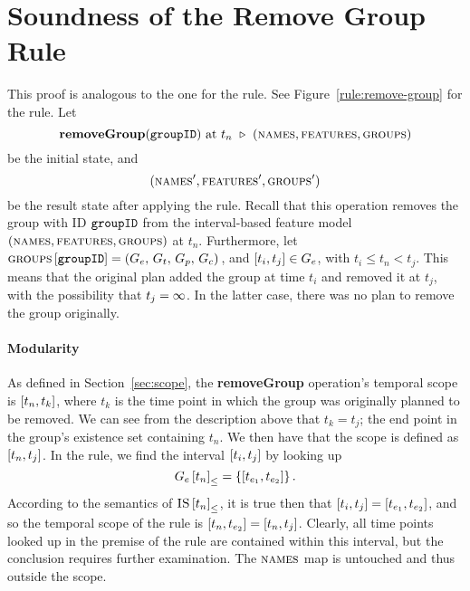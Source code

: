 \section{Soundness of the Remove Group Rule}
\label{sec:soundness-of-the-remove-group-rule}
This proof is analogous to the one for the  rule.
See Figure~\vref{rule:remove-group} for the  rule. Let
\[
      \textbf{removeGroup}(\texttt{groupID}) \text{ at } t_n \ \triangleright \  (\textsc{names}, \textsc{features}, \textsc{groups}{})
\]
be the initial state, and
\[
   (\textsc{names}', \textsc{features}', \textsc{groups}{}')
\]
be the result state after applying the  rule. Recall that this operation removes the group with ID $\texttt{groupID}$ from the interval-based feature model $(\textsc{names}, \textsc{features}, \textsc{groups}{})$ at $t_n$. Furthermore, let $\textsc{groups}{} \left[ \texttt{groupID} \right] = \left(G_e,\, G_t,\, G_p,\, G_c\right){}$, and $\interval{t_i}{t_j} \in G_e$, with $t_i \leq t_n < t_j$. This means that the original plan added the group at time $t_i$ and removed it at $t_j$, with the possibility that $t_j = \infty$. In the latter case, there was no plan to remove the group originally.

\paragraph{Modularity}

As defined in Section~\vref{sec:scope}, the \textbf{removeGroup} operation's temporal scope is $\interval{t_n}{t_k}$, where $t_k$ is the time point in which the group was originally planned to be removed. We can see from the description above that $t_k = t_j$; the end point in the group's existence set containing $t_n$. We then have that the scope is defined as $\interval{t_n}{t_j}$. In the rule, we find the interval $\interval{t_i}{t_j}$ by looking up
\[
   \containing{G_e}{t_n} = \set{\interval{t_{e_1}}{t_{e_2}}}.
\]
According to the semantics of ${\textsc{IS} \left[ t_n \right]}_{\leq}$, it is true then that $\interval{t_i}{t_j} = \interval{t_{e_1}}{t_{e_2}}$, and so the temporal scope of the rule is $\interval{t_n}{t_{e_2}} = \interval{t_n}{t_j}$. Clearly, all time points looked up in the premise of the rule are contained within this interval, but the conclusion requires further examination. The $\textsc{names}{}$ map is untouched and thus outside the scope. 

